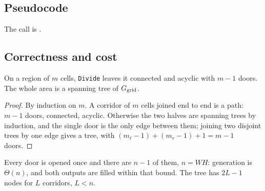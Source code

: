 \subsection{Pseudocode}

\begin{algorithm}[H]
\caption{Generation: fills the graph $N$ and returns the tree.}
\label{alg:generate}
\end{algorithm}

The call is .

\subsection{Correctness and cost}

\begin{proposition}
\label{prop:tree}
On a region of $m$ cells, \textup{\texttt{Divide}} leaves it connected and
acyclic with $m-1$ doors. The whole area is a spanning tree of $G_{\text{grid}}$.
\end{proposition}

\begin{proof}
By induction on $m$. A corridor of $m$ cells joined end to end is a path: $m-1$
doors, connected, acyclic. Otherwise the two halves are spanning trees by
induction, and the single door is the only edge between them; joining two
disjoint trees by one edge gives a tree, with $(m_\ell-1)+(m_r-1)+1=m-1$ doors.
\end{proof}

Every door is opened once and there are $n-1$ of them, $n=WH$: generation is
$\Theta(n)$, and both outputs are filled within that bound. The tree has $2L-1$
nodes for $L$ corridors, $L<n$.
